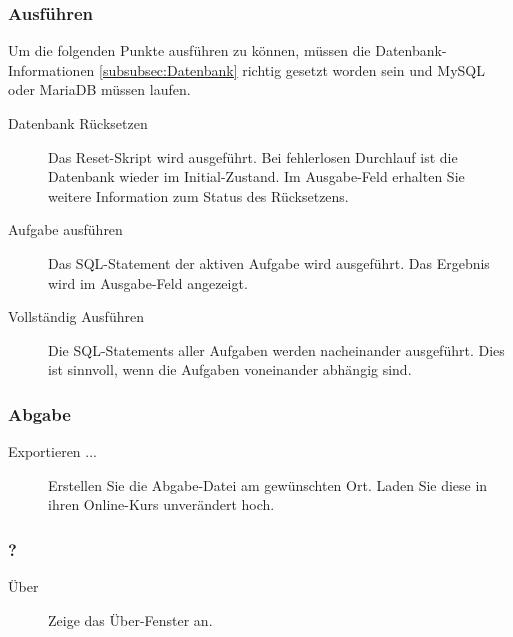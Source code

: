 \documentclass[11pt]{article}
\begin{document}
\subsubsection{Ausführen}
\label{subsubsec:run}
Um die folgenden Punkte ausführen zu können, müssen die Datenbank-\linebreak Informationen \ref{subsubsec:Datenbank} richtig gesetzt worden sein und MySQL oder MariaDB müssen laufen.
\begin{description}
	\item[\label{item:reset} Datenbank Rücksetzen] Das Reset-Skript wird ausgeführt. Bei fehlerlosen Durchlauf ist die Datenbank wieder im Initial-Zustand. Im Ausgabe-Feld erhalten Sie weitere Information zum Status des Rücksetzens. 
	\item[\label{item:runTask} Aufgabe ausführen] Das SQL-Statement der aktiven Aufgabe wird ausgeführt. Das Ergebnis wird im Ausgabe-Feld angezeigt.
	\item[\label{item:runComplete} Vollständig Ausführen] Die SQL-Statements aller Aufgaben werden nacheinander ausgeführt. Dies ist sinnvoll, wenn die Aufgaben voneinander abhängig sind.
\end{description}

\subsubsection{Abgabe}
\label{subsubsec:Abgabe}
\begin{description}
\item[\label{item:export} Exportieren ...] Erstellen Sie die Abgabe-Datei am gewünschten Ort. Laden Sie diese in ihren Online-Kurs unverändert hoch.
\end{description}

\subsubsection{?}
\label{subsubsec:?}
\begin{description}
	\item[\label{item:about} Über] Zeige das Über-Fenster an.
\end{description}
\end{document}
